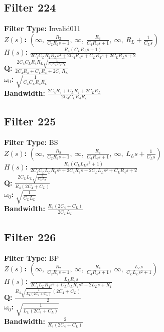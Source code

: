 \documentclass{article}
\begin{document}
\subsection*{Filter 224}
\textbf{Filter Type:} Invalid011 \\ 
\textbf{$Z(s)$:} $\left( \infty, \  \frac{R_{2}}{C_{2} R_{2} s + 1}, \  \infty, \  \frac{R_{4}}{C_{4} R_{4} s + 1}, \  \infty, \  R_{L} + \frac{1}{C_{L} s}\right)$ \\ 
\textbf{$H(s)$:} $\frac{R_{4} \left(C_{L} R_{L} s + 1\right)}{2 C_{4} C_{L} R_{4} R_{L} s^{2} + 2 C_{4} R_{4} s + C_{L} R_{4} s + 2 C_{L} R_{L} s + 2}$ \\ 
\textbf{Q:} $\frac{2 C_{4} C_{L} R_{4} R_{L} \sqrt{\frac{1}{C_{4} C_{L} R_{4} R_{L}}}}{2 C_{4} R_{4} + C_{L} R_{4} + 2 C_{L} R_{L}}$ \\ 
\textbf{$\omega_0$:} $\sqrt{\frac{1}{C_{4} C_{L} R_{4} R_{L}}}$ \\ 
\textbf{Bandwidth:} $\frac{2 C_{4} R_{4} + C_{L} R_{4} + 2 C_{L} R_{L}}{2 C_{4} C_{L} R_{4} R_{L}}$ \\ 
\subsection*{Filter 225}
\textbf{Filter Type:} BS \\ 
\textbf{$Z(s)$:} $\left( \infty, \  \frac{R_{2}}{C_{2} R_{2} s + 1}, \  \infty, \  \frac{R_{4}}{C_{4} R_{4} s + 1}, \  \infty, \  L_{L} s + \frac{1}{C_{L} s}\right)$ \\ 
\textbf{$H(s)$:} $\frac{R_{4} \left(C_{L} L_{L} s^{2} + 1\right)}{2 C_{4} C_{L} L_{L} R_{4} s^{3} + 2 C_{4} R_{4} s + 2 C_{L} L_{L} s^{2} + C_{L} R_{4} s + 2}$ \\ 
\textbf{Q:} $\frac{2 C_{L} L_{L} \sqrt{\frac{1}{C_{L} L_{L}}}}{R_{4} \left(2 C_{4} + C_{L}\right)}$ \\ 
\textbf{$\omega_0$:} $\sqrt{\frac{1}{C_{L} L_{L}}}$ \\ 
\textbf{Bandwidth:} $\frac{R_{4} \left(2 C_{4} + C_{L}\right)}{2 C_{L} L_{L}}$ \\ 
\subsection*{Filter 226}
\textbf{Filter Type:} BP \\ 
\textbf{$Z(s)$:} $\left( \infty, \  \frac{R_{2}}{C_{2} R_{2} s + 1}, \  \infty, \  \frac{R_{4}}{C_{4} R_{4} s + 1}, \  \infty, \  \frac{L_{L} s}{C_{L} L_{L} s^{2} + 1}\right)$ \\ 
\textbf{$H(s)$:} $\frac{L_{L} R_{4} s}{2 C_{4} L_{L} R_{4} s^{2} + C_{L} L_{L} R_{4} s^{2} + 2 L_{L} s + R_{4}}$ \\ 
\textbf{Q:} $\frac{R_{4} \sqrt{\frac{1}{L_{L} \left(2 C_{4} + C_{L}\right)}} \left(2 C_{4} + C_{L}\right)}{2}$ \\ 
\textbf{$\omega_0$:} $\sqrt{\frac{1}{L_{L} \left(2 C_{4} + C_{L}\right)}}$ \\ 
\textbf{Bandwidth:} $\frac{2}{R_{4} \left(2 C_{4} + C_{L}\right)}$ \\ 
\end{document}
